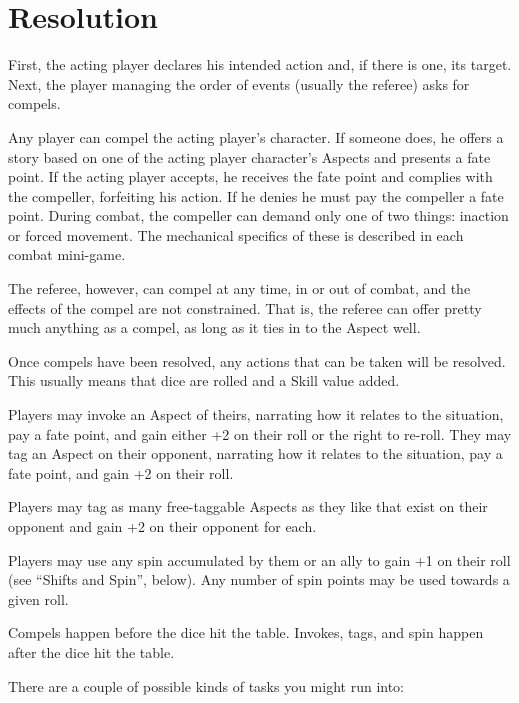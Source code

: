 \newpage
\section{Resolution}
\label{sec:resolution}

First, the acting player declares his intended action and, if there is one, its target. Next, the player managing the order of events (usually the referee) asks for compels.

Any player can compel the acting player's character. If someone does, he offers a story based on one of the acting player character's Aspects and presents a fate point. If the acting player accepts, he receives the fate point and complies with the compeller, forfeiting his action. If he denies he must pay the compeller a fate point. During combat, the compeller can demand only one of two things: inaction or forced movement. The mechanical specifics of these is described in each combat mini-game.

The referee, however, can compel at any time, in or out of combat, and the effects of the compel are not constrained. That is, the referee can offer pretty much anything as a compel, as long as it ties in to the Aspect well.

Once compels have been resolved, any actions that can be taken will be resolved. This usually means that dice are rolled and a Skill value added.

Players may invoke an Aspect of theirs, narrating how it relates to the situation, pay a fate point, and gain either +2 on their roll or the right to re-roll. They may tag an Aspect on their opponent, narrating how it relates to the situation, pay a fate point, and gain +2 on their roll.

Players may tag as many free-taggable Aspects as they like that exist on their opponent and gain +2 on their opponent for each.

Players may use any spin accumulated by them or an ally to gain +1 on their roll (see ``Shifts and Spin'', below). Any number of spin points may be used towards a given roll.

Compels happen before the dice hit the table.
Invokes, tags, and spin happen after the dice hit the table.

There are a couple of possible kinds of tasks you might run into:

\vfil

